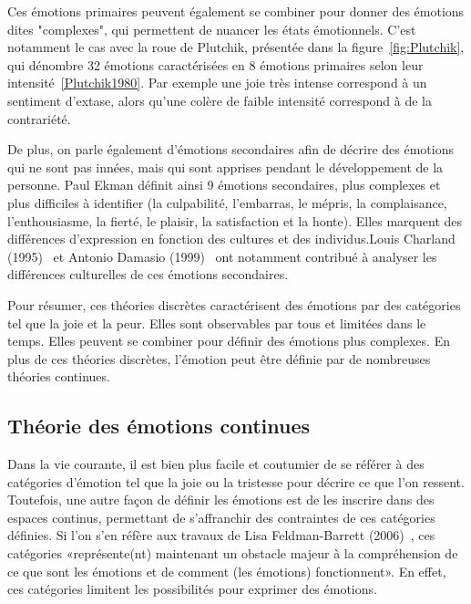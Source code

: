 

Ces émotions primaires peuvent également se combiner pour donner des émotions dites "complexes", qui permettent de nuancer les états émotionnels. C'est notamment le cas avec la roue de Plutchik, présentée dans la figure~\ref{fig:Plutchik}, qui dénombre 32 émotions caractérisées en 8 émotions primaires selon leur intensité~\ref{Plutchik1980}. Par exemple une joie très intense correspond à un sentiment d'extase, alors qu'une colère de faible intensité correspond à de la contrariété.

De plus, on parle également d'émotions secondaires afin de décrire des émotions qui ne sont pas innées, mais qui sont apprises pendant le développement de la personne. Paul Ekman définit ainsi 9 émotions secondaires, plus complexes et plus difficiles à identifier (la culpabilité, l'embarras, le mépris, la complaisance, l'enthousiasme, la fierté, le plaisir, la satisfaction et la honte). Elles marquent des différences d'expression en fonction des cultures et des individus.Louis Charland (1995)~\cite{Charland1995} et Antonio Damasio (1999)~\cite{Damasio1999} ont notamment contribué à analyser les différences culturelles de ces émotions secondaires.

Pour résumer, ces théories discrètes caractérisent des émotions par des catégories tel que la joie et la peur. Elles sont observables par tous et limitées dans le temps. Elles peuvent se combiner pour définir des émotions plus complexes.
En plus de ces théories discrètes, l'émotion peut être définie par de nombreuses théories continues.

\subsection{Théorie des émotions continues}


Dans la vie courante, il est bien plus facile et coutumier de se référer à des catégories d'émotion tel que la joie ou la tristesse pour décrire ce que l'on ressent. Toutefois, une autre façon de définir les émotions est de les inscrire dans des espaces continus, permettant de s'affranchir des contraintes de ces catégories définies. Si l'on s'en réfère aux travaux de Lisa Feldman-Barrett (2006)~\cite{Feldman2006}, ces catégories «représente(nt) maintenant un obstacle majeur à la compréhension de ce que sont les émotions et de comment (les émotions) fonctionnent». En effet, ces catégories limitent les possibilités pour exprimer des émotions.

